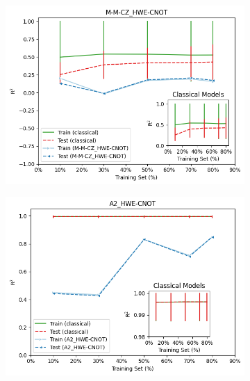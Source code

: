 \documentclass[journal=jacsat,manuscript=article]{achemso}
\begin{document}
\begin{figure}[H]
	\centering	
	\begin{subfigure}[b]{0.49\textwidth}
		\centering
		\includegraphics[width=\linewidth]{../images/BSE/fivequbit/BSE_learningcurve}
		\caption{}
		\label{fig:BSE5_learning_curves}
	\end{subfigure}	
	\hfill
	\begin{subfigure}{0.49\textwidth}
		\centering
		\includegraphics[width=\linewidth]{../images/DDCC/DDCC_learning_curves}
		\caption{}
		\label{fig:ddcclearningcurves}
	\end{subfigure}
	\caption{}
	\label{fig:learningcurves}
	
\end{figure}
\end{document}
